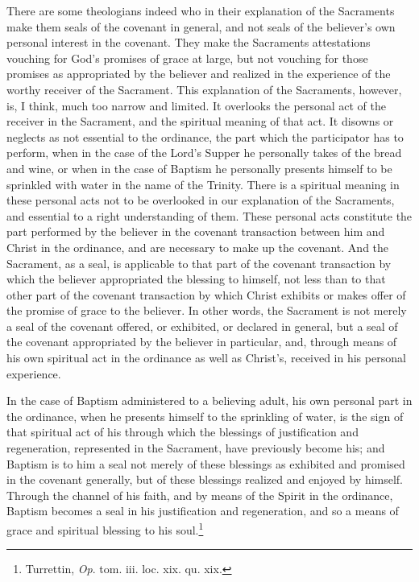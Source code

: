 \documentclass[]{book}
\begin{document}
There are some theologians indeed who in their explanation of the Sacraments make them seals of the covenant in general, and not seals of the believer's own personal interest in the covenant. They make the Sacraments attestations vouching for God's promises of grace at large, but not vouching for those promises as appropriated by the believer and realized in the experience of the worthy receiver of the Sacrament. This explanation of the Sacraments, however, is, I think, much too narrow and limited. It overlooks the personal act of the receiver in the Sacrament, and the spiritual meaning of that act. It disowns or neglects as not essential to the ordinance, the part which the participator has to perform, when in the case of the Lord's Supper he personally takes of the bread and wine, or when in the case of Baptism he personally presents himself to be sprinkled with water in the name of the Trinity. There is a spiritual meaning in these personal acts not to be overlooked in our explanation of the Sacraments, and essential to a right understanding of them. These personal acts constitute the part performed by the believer in the covenant transaction between him and Christ in the ordinance, and are necessary to make up the covenant. And the Sacrament, as a seal, is applicable to that part of the covenant transaction by which the believer appropriated the blessing to himself, not less than to that other part of the covenant transaction by which Christ exhibits or makes offer of the promise of grace to the believer. In other words, the Sacrament is not merely a seal of the covenant offered, or exhibited, or declared in general, but a seal of the covenant appropriated by the believer in particular, and, through means of his own spiritual act in the ordinance as well as Christ's, received in his personal experience.

In the case of Baptism administered to a believing adult, his own personal part in the ordinance, when he presents himself to the sprinkling of water, is the sign of that spiritual act of his through which the blessings of justification and regeneration, represented in the Sacrament, have previously become his; and Baptism is to him a seal not merely of these blessings as exhibited and promised in the covenant generally, but of these blessings realized and enjoyed by himself. Through the channel of his faith, and by means of the Spirit in the ordinance, Baptism becomes a seal in his justification and regeneration, and so a means of grace and spiritual blessing to his soul.\footnote{Turrettin, \emph{Op}. tom. iii. loc. xix. qu. xix.}
\end{document}
